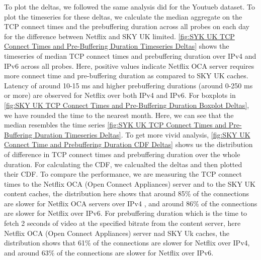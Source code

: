 To plot the deltas, we followed the same analysis \cite{bajpaimeasuring} did for the Youtueb dataset. To plot the timeseries for these deltas, we calculate the median aggregate on the
TCP connect times and the prebuffering duration across all probes on each day for the difference between Netflix and SKY UK limited.
\cref{fig:SYK UK TCP Connect Times and Pre-Buffering Duration Timeseries Deltas} shows the timeseries of median TCP connect times and prebuffering duration over IPv4 and IPv6 across all probes.
Here, positive values indicate Netflix OCA server requires more connect time and pre-buffering duration as compared to SKY UK caches. Latency of around 10-15 ms and higher prebuffering durations (around 0-250 ms or more) are observed for Netflix over both IPv4 and IPv6.
For boxplots in \cref{fig:SKY UK TCP Connect Times and Pre-Buffering Duration Boxplot Deltas}, we have rounded the time to the nearest month. Here, we can see that the median resembles the time series \cref{fig:SYK UK TCP Connect Times and Pre-Buffering Duration Timeseries Deltas}.
To get more vivid analysis, \cref{fig:SKY UK Connect Time and Prebuffering Duration CDF Deltas} shows us the distribution of difference in TCP connect times and prebuffering duration over the whole duration.
For calculating the CDF, we calcualted the deltas and then plotted their CDF. To compare the performance, 
we are measuring the TCP connect times to the Netflix OCA (Open Connect Appliances) server and to the SKY UK content caches, 
the distribution here shows that around 85\% of the connections are slower for Netflix OCA servers over IPv4 , and around 86\% of the connections are slower for Netflix over IPv6. 
For prebuffering duration which is the time to fetch 2 seconds of video at the specified bitrate from the content server, here Netflix OCA (Open Connect Appliances) server nad SKY Uk caches,
the distribution shows that 61\% of the connections are slower for Netflix over IPv4, and around 63\% of the connections are slower for Netflix over IPv6.


